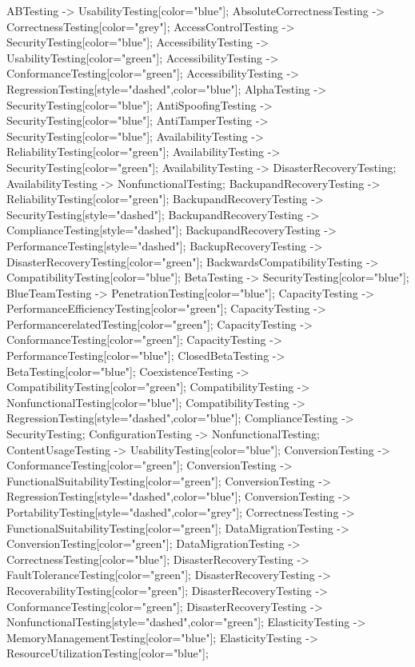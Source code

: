 \documentclass{article}
\begin{document}
{ABTesting -> UsabilityTesting[color="blue"];
AbsoluteCorrectnessTesting -> CorrectnessTesting[color="grey"];
AccessControlTesting -> SecurityTesting[color="blue"];
AccessibilityTesting -> UsabilityTesting[color="green"];
AccessibilityTesting -> ConformanceTesting[color="green"];
AccessibilityTesting -> RegressionTesting[style="dashed",color="blue"];
AlphaTesting -> SecurityTesting[color="blue"];
AntiSpoofingTesting -> SecurityTesting[color="blue"];
AntiTamperTesting -> SecurityTesting[color="blue"];
AvailabilityTesting -> ReliabilityTesting[color="green"];
AvailabilityTesting -> SecurityTesting[color="green"];
AvailabilityTesting -> DisasterRecoveryTesting;
AvailabilityTesting -> NonfunctionalTesting;
BackupandRecoveryTesting -> ReliabilityTesting[color="green"];
BackupandRecoveryTesting -> SecurityTesting[style="dashed"];
BackupandRecoveryTesting -> ComplianceTesting[style="dashed"];
BackupandRecoveryTesting -> PerformanceTesting[style="dashed"];
BackupRecoveryTesting -> DisasterRecoveryTesting[color="green"];
BackwardsCompatibilityTesting -> CompatibilityTesting[color="blue"];
BetaTesting -> SecurityTesting[color="blue"];
BlueTeamTesting -> PenetrationTesting[color="blue"];
CapacityTesting -> PerformanceEfficiencyTesting[color="green"];
CapacityTesting -> PerformancerelatedTesting[color="green"];
CapacityTesting -> ConformanceTesting[color="green"];
CapacityTesting -> PerformanceTesting[color="blue"];
ClosedBetaTesting -> BetaTesting[color="blue"];
CoexistenceTesting -> CompatibilityTesting[color="green"];
CompatibilityTesting -> NonfunctionalTesting[color="blue"];
CompatibilityTesting -> RegressionTesting[style="dashed",color="blue"];
ComplianceTesting -> SecurityTesting;
ConfigurationTesting -> NonfunctionalTesting;
ContentUsageTesting -> UsabilityTesting[color="blue"];
ConversionTesting -> ConformanceTesting[color="green"];
ConversionTesting -> FunctionalSuitabilityTesting[color="green"];
ConversionTesting -> RegressionTesting[style="dashed",color="blue"];
ConversionTesting -> PortabilityTesting[style="dashed",color="grey"];
CorrectnessTesting -> FunctionalSuitabilityTesting[color="green"];
DataMigrationTesting -> ConversionTesting[color="green"];
DataMigrationTesting -> CorrectnessTesting[color="blue"];
DisasterRecoveryTesting -> FaultToleranceTesting[color="green"];
DisasterRecoveryTesting -> RecoverabilityTesting[color="green"];
DisasterRecoveryTesting -> ConformanceTesting[color="green"];
DisasterRecoveryTesting -> NonfunctionalTesting[style="dashed",color="green"];
ElasticityTesting -> MemoryManagementTesting[color="blue"];
ElasticityTesting -> ResourceUtilizationTesting[color="blue"];
}
\end{document}
